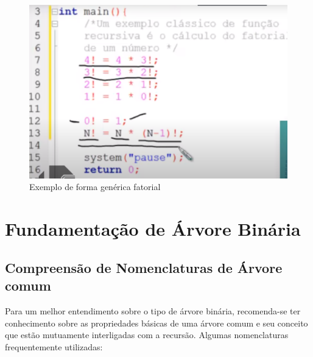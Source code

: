 \documentclass[
	12pt,				%
	oneside,   	        %
	a4paper,			%
	chapter=TITLE,		%
	section=TITLE,		%
	subsection=TITLE,	%
	subsubsection=TITLE,%
	english,			%
	french,				%
	spanish,			%
	brazil,				%
	]{pacotes/abntex2}
\begin{document}
\begin{itemize}
           \begin{figure}[H]
             \centering
             \includegraphics[scale=0.5]{Figuras/rec-fatorial2.png}
             \caption{Exemplo de forma genérica fatorial \cite{imagem3}}
             \label{fig:partições}
            \end{figure}
            
         \end{itemize}

\section{\textbf{Fundamentação de Árvore Binária}}
\label{sec:fundamentacao}

\subsection{\textbf{Compreensão de Nomenclaturas de Árvore comum}}
\label{subsec:árvore-comum}

Para um melhor entendimento sobre o tipo de árvore binária, recomenda-se ter conhecimento sobre as propriedades básicas de uma árvore comum e seu conceito que estão mutuamente interligadas com a recursão. Algumas nomenclaturas frequentemente utilizadas:
\end{document}
